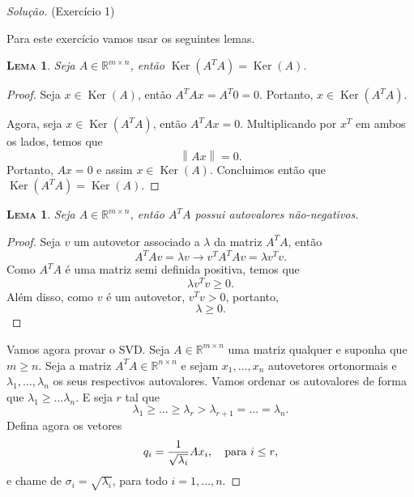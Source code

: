 \documentclass[a4paper,10pt]{article}
\newenvironment{solution}
  {\begin{proof}[Solução]}
  {\end{proof}}
\newtheorem{lema}[theorem]{\scshape Lema}
\newcommand{\norm}[1]{\left\lVert#1\right\rVert}
\DeclareMathOperator{\Ker}{Ker}
\begin{document}
  \begin{solution}{(Exercício 1)}

    Para este exercício vamos usar os seguintes lemas.

    \begin{lema}\label{lem:1}
      Seja $A \in \mathbb{R}^{m\times n}$, então $\Ker(A^TA) = \Ker(A)$.
    \end{lema}
    \begin{proof}

        Seja $x\in \Ker(A)$, então $A^TAx = A^T0 = 0$. Portanto, $x\in \Ker(A^TA)$.

        Agora, seja $x \in \Ker(A^TA)$, então $A^TAx = 0$. Multiplicando por $x^T$ em
        ambos os lados, temos que
        \begin{equation*}
          \norm{Ax} = 0.
        \end{equation*}
        Portanto, $Ax = 0$ e assim $x \in \Ker(A)$. Concluimos então que $\Ker(A^TA) = \Ker(A)$.
    \end{proof}

    \begin{lema}\label{lem:2}
      Seja $A \in \mathbb{R}^{m \times n}$, então $A^TA$ possui autovalores não-negativos.
    \end{lema}
    \begin{proof}
      Seja $v$ um autovetor associado a $\lambda$ da matriz $A^TA$, então
      \begin{equation*}
        A^TAv = \lambda v \rightarrow v^TA^TAv = \lambda v^Tv.
      \end{equation*}
      Como $A^TA$ é uma matriz semi definida positiva, temos que
      \begin{equation*}
        \lambda v^Tv \geq 0.
      \end{equation*}
      Além disso, como $v$ é um autovetor, $v^Tv > 0$, portanto,
      \begin{equation*}
        \lambda \geq 0.
      \end{equation*}
    \end{proof}

    Vamos agora provar o SVD. Seja $A\in \mathbb{R}^{m\times n}$ uma matriz qualquer e suponha
    que $m \geq n$. Seja a matriz $A^TA \in \mathbb{R}^{n \times n}$ e
    sejam $x_1, \dots, x_n$ autovetores ortonormais e $\lambda_1,\dots,\lambda_n$ os seus
    respectivos autovalores. Vamos ordenar os autovalores de forma que
    $\lambda_1 \geq \dots \lambda_n$. E seja $r$ tal que
    \begin{equation*}
      \lambda_1 \geq \dots \geq \lambda_r > \lambda_{r+1} = \dots = \lambda_n.
    \end{equation*}
    Defina agora os vetores
    \begin{equation*}
      q_i = \frac{1}{\sqrt{\lambda_i}}Ax_i, \quad \textnormal{para $i\leq r$},
    \end{equation*}
    e chame de $\sigma_i = \sqrt{\lambda_i}$, para todo $i=1,\dots,n$.


\end{solution}
\end{document}
